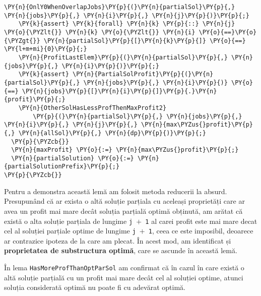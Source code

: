 \begin{footnotesize}
\begin{Verbatim}[commandchars=\\\{\}, fontsize=\footnotesize]
    \PY{n}{OnlY0WhenOverlapJobs}\PY{p}{(}\PY{n}{partialSol}\PY{p}{,} \PY{n}{jobs}\PY{p}{,} \PY{n}{i}\PY{p}{,} \PY{n}{j}\PY{p}{)}\PY{p}{;} 
    \PY{k}{assert} \PY{k}{forall} \PY{n}{k} \PY{p}{::} \PY{n}{j} \PY{o}{\PYZlt{}} \PY{n}{k} \PY{o}{\PYZlt{}} \PY{n}{i} \PY{o}{==}\PY{o}{\PYZgt{}} \PY{n}{partialSol}\PY{p}{[}\PY{n}{k}\PY{p}{]} \PY{o}{==} \PY{l+m+mi}{0}\PY{p}{;}
    \PY{n}{ProfitLastElem}\PY{p}{(}\PY{n}{partialSol}\PY{p}{,} \PY{n}{jobs}\PY{p}{,} \PY{n}{i}\PY{p}{)}\PY{p}{;}
    \PY{k}{assert} \PY{n}{PartialSolProfit}\PY{p}{(}\PY{n}{partialSol}\PY{p}{,} \PY{n}{jobs}\PY{p}{,} \PY{n}{i}\PY{p}{)} \PY{o}{==} \PY{n}{jobs}\PY{p}{[}\PY{n}{i}\PY{p}{]}\PY{p}{.}\PY{n}{profit}\PY{p}{;}
    \PY{n}{OtherSolHasLessProfThenMaxProfit2}
        \PY{p}{(}\PY{n}{partialSol}\PY{p}{,} \PY{n}{jobs}\PY{p}{,} \PY{n}{i}\PY{p}{,} \PY{n}{j}\PY{p}{,} \PY{n}{max\PYZus{}profit}\PY{p}{,} \PY{n}{allSol}\PY{p}{,} \PY{n}{dp}\PY{p}{)}\PY{p}{;}
  \PY{p}{\PYZcb{}}
  \PY{n}{maxProfit} \PY{o}{:=} \PY{n}{max\PYZus{}profit}\PY{p}{;}
  \PY{n}{partialSolution} \PY{o}{:=} \PY{n}{partialSolutionPrefix}\PY{p}{;}
\PY{p}{\PYZcb{}}
\end{Verbatim}
\end{footnotesize}

Pentru a demonstra această lemă am folosit metoda reducerii la absurd. Presupunând că ar exista o altă soluție parțiala cu aceleași proprietăți care ar avea un profit mai mare decât soluția parțială optimă obținută, am arătat că există o alta soluție parțiala de lungime \texttt{j $+$ 1} al carei profit este mai mare decat cel al soluției parțiale optime de lungime \texttt{j $+$ 1}, ceea ce este imposibil, deoarece ar contrazice ipoteza de la care am plecat. În acest mod, am identificat și \textbf{proprietatea de substructura optimă}, care se ascunde în această lemă. 

În lema \texttt{HasMoreProfThanOptParSol} am confirmat că în cazul în care există o altă soluție parțială cu un profit mai mare decât cel al soluției optime, atunci soluția considerată optimă nu poate fi cu adevărat optimă.


